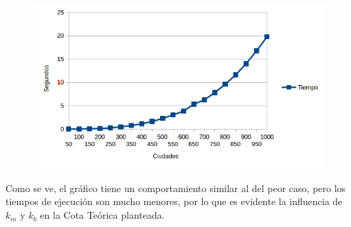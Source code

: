     \begin{figure}[h!]
   \begin{center}
	\includegraphics[scale=0.8]{imagenes/ej1/aleatorio1.png}
   \end{center}
  \end{figure}
  
  Como se ve, el gr\'afico tiene un comportamiento similar al del peor caso, pero los tiempos de ejecuci\'on son mucho menores, por lo que es evidente la influencia de $k_m$ y $k_b$ en la Cota Te\'orica planteada.
  
  
  
  
  
  
  
  
